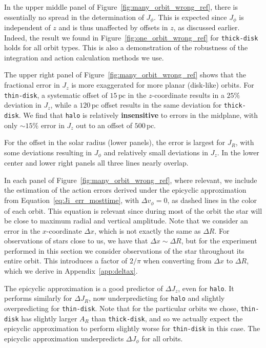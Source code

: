 \documentclass[twocolumn]{aastex62}
\newcommand{\pc}{\text{pc}}
\newcommand{\thin}{\texttt{thin-disk}}
\newcommand{\thick}{\texttt{thick-disk}}
\newcommand{\halo}{\texttt{halo}}
\begin{document}
In the upper middle panel of Figure~\ref{fig:many_orbit_wrong_ref}, there is
essentially no spread in the determination of $J_{\phi}$. This is expected
since $J_{\phi}$ is independent of $z$ and is thus unaffected by offsets in
$z$, as discussed earlier. Indeed, the result we found in
Figure~\ref{fig:one_orbit_wrong_ref} for \thick{} holds for all orbit types.
This is also a demonstration of the robustness of the integration and action
calculation methods we use.

The upper right panel of Figure~\ref{fig:many_orbit_wrong_ref} shows that the
fractional error in $J_z$ is more exaggerated for more planar (disk-like)
orbits. For \thin{}, a systematic offset of $15\,\pc$ in the $z$-coordinate
results in a $25\%$ deviation in $J_z$, while a $120\,\pc$ offset results in
the same deviation for \thick{}. We find that \halo{} is relatively
\textbf{insensitive} to errors in the midplane, with only $\sim15\%$ error in
$J_z$ out to an offset of $500\,\pc$.

For the offset in the solar radius (lower panels), the error is largest for
$J_R$, with some deviations resulting in $J_{\phi}$ and relatively small
deviations in $J_z$. In the lower center and lower right panels all three
lines nearly overlap.

In each panel of Figure~\ref{fig:many_orbit_wrong_ref}, where relevant, we
include the estimation of the action errors derived under the epicyclic
approximation from Equation~\eqref{eq:Ji_err_mosttime}, with $\Delta
v_{\phi}=0$, as dashed lines in the color of each orbit. This equation is
relevant since during most of the orbit the star will be close to maximum
radial and vertical amplitude. Note that we consider an error in the
$x$-coordinate $\Delta x$, which is not exactly the same as $\Delta R$. For
observations of stars close to us, we have that $\Delta x \sim \Delta R$, but
for the experiment performed in this section we consider observations of the
star throughout its entire orbit. This introduces a factor of $2/\pi$ when
converting from $\Delta x$ to $\Delta R$, which we derive in
Appendix~\ref{app:deltax}.

The epicyclic approximation is a good predictor of $\Delta J_z$, even for \halo{}.
It performs similarly for $\Delta J_R$, now underpredicting for \halo{}
and slightly overpredicting for \thin{}. Note that for the
particular orbits we chose, \thin{} has slightly larger $A_R$ than
\thick{}, and so we actually expect the epicyclic approximation to perform
slightly worse for \thin{} in this case. The epicyclic approximation
underpredicts $\Delta J_{\phi}$ for all orbits.
\end{document}
